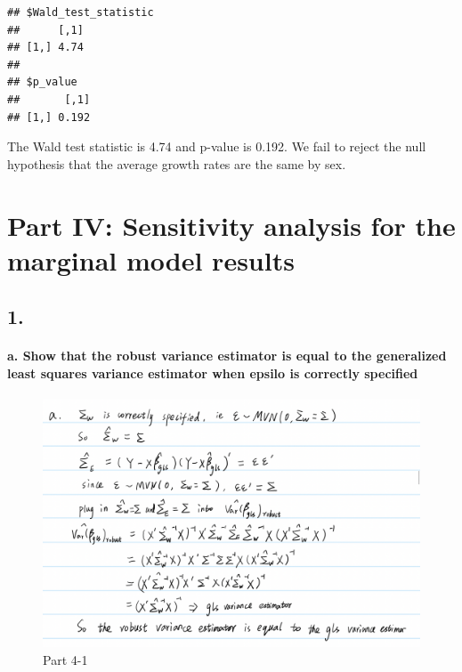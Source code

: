 \documentclass[
]{article}
\begin{document}
\begin{verbatim}
## $Wald_test_statistic
##      [,1]
## [1,] 4.74
## 
## $p_value
##       [,1]
## [1,] 0.192
\end{verbatim}

The Wald test statistic is 4.74 and p-value is 0.192. We fail to reject
the null hypothesis that the average growth rates are the same by sex.

\hypertarget{part-iv-sensitivity-analysis-for-the-marginal-model-results}{%
\section{Part IV: Sensitivity analysis for the marginal model
results}\label{part-iv-sensitivity-analysis-for-the-marginal-model-results}}

\hypertarget{section}{%
\subsection{1.}\label{section}}

\hypertarget{a.-show-that-the-robust-variance-estimator-is-equal-to-the-generalized-least-squares-variance-estimator-when-epsilo-is-correctly-specified}{%
\paragraph{a. Show that the robust variance estimator is equal to the
generalized least squares variance estimator when epsilo is correctly
specified}\label{a.-show-that-the-robust-variance-estimator-is-equal-to-the-generalized-least-squares-variance-estimator-when-epsilo-is-correctly-specified}}

\begin{figure}
\centering
\includegraphics[width=5.20833in,height=\textheight]{images/problemset3.png}
\caption{Part 4-1}
\end{figure}
\end{document}
